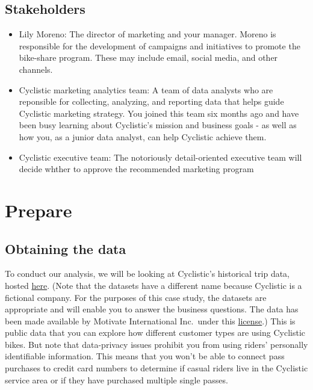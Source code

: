 \documentclass{article}
\begin{document}
\subsection*{Stakeholders}

\begin{itemize}
\item Lily Moreno: The director of marketing and your manager. Moreno is responsible for the development of campaigns and initiatives to promote the bike-share program. These may include email, social media, and other channels.
\item Cyclistic marketing analytics team: A team of data analysts who are reponsible for collecting, analyzing, and reporting data that helps guide Cyclistic marketing strategy. You joined this team six months ago and have been busy learning about Cyclistic's mission and business goals - as well as how you, as a junior data analyst, can help Cyclistic achieve them.
  \item Cyclistic executive team: The notoriously detail-oriented executive team will decide whther to approve the recommended marketing program
\end{itemize}

\section{Prepare}

\subsection*{Obtaining the data}

To conduct our analysis, we will be looking at Cyclistic's historical trip data, hosted \href{https://divvy-tripdata.s3.amazonaws.com/index.html}{here}. (Note that the datasets have a different name because Cyclistic is a fictional company. For the purposes of this case study, the datasets are appropriate and will enable you to answer the business questions. The data has been made available by Motivate International Inc.~under this \href{https://www.divvybikes.com/data-license-agreement}{license}.) This is public data that you can explore how different customer types are using Cyclistic bikes. But note that data-privacy issues prohibit you from using riders' personally identifiable information. This means that you won't be able to connect pass purchases to credit card numbers to determine if casual riders live in the Cyclistic service area or if they have purchased multiple single passes.
\end{document}
